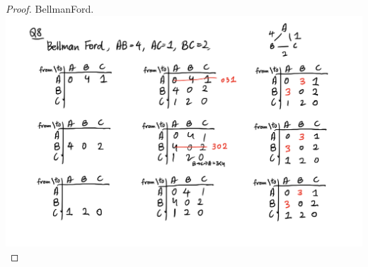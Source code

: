 \documentclass[./answersheet.tex]{subfiles}
\begin{document}
\begin{proof}
    BellmanFord.\\
    \includegraphics[width=\columnwidth]{./bellman_ford.jpeg}
\end{proof}
\end{document}

